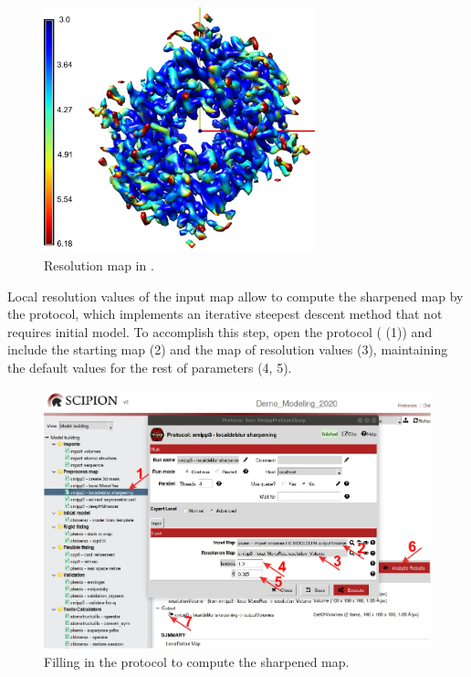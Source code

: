 \begin{figure}[H]
  \centering 
  \captionsetup{width=.7\linewidth} 
  \includegraphics[width=0.70\textwidth]
  {Images/Fig57}
  \caption{Resolution map in \chimera.}
  \label{fig:localMonoRes_3}
  \end{figure}
  
Local resolution values of the input map allow to compute the sharpened map by the  protocol, which implements an iterative steepest descent method that not requires initial model. To accomplish this step, open the protocol ( (1)) and include the starting map (2) and the map of resolution values (3), maintaining the default values for the rest of parameters (4, 5). 

\begin{figure}[H]
  \centering 
  \captionsetup{width=.9\linewidth} 
  \includegraphics[width=1\textwidth]
  {Images/Fig58}
  \caption{Filling in the protocol to compute the sharpened map.}
  \label{fig:localdeblur_1}
  \end{figure}
  
